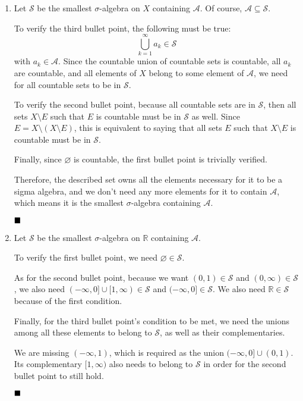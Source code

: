 \documentclass[11pt, a4paper, tikz]{article}
\renewcommand{\qed}{\hfill\blacksquare}
\newcommand{\reals}{
	\ensuremath{\mathbb{R}}
}
\newcommand{\sigmaAlgebra}[1]{
	\ensuremath{\mathcal{#1}}
}
\begin{document}
		\begin{enumerate}[label=\alph*)]
		\item Let $\sigmaAlgebra{S}$ be the smallest $\sigma$-algebra on $X$ containing $\mathcal{A}$. Of course, $\mathcal{A}\subseteq\sigmaAlgebra{S}$.
		
		To verify the third bullet point, the following must be true: \[\bigcup_{k=1}^{\infty}a_k\in\sigmaAlgebra{S}\] with $a_k\in\mathcal{A}$. Since the countable union of countable sets is countable, all $a_k$ are countable, and all elements of $X$ belong to some element of $\mathcal{A}$, we need for all countable sets to be in $\sigmaAlgebra{S}$.
		
		To verify the second bullet point, because all countable sets are in $\sigmaAlgebra{S}$, then all sets $X\setminus E$ such that $E$ is countable must be in $\sigmaAlgebra{S}$ as well. Since $E = X\setminus(X\setminus E)$, this is equivalent to saying that all sets $E$ such that $X\setminus E$ is countable must be in $\sigmaAlgebra{S}$.
		
		Finally, since $\varnothing$ is countable, the first bullet point is trivially verified.
		
		Therefore, the described set owns all the elements necessary for it to be a sigma algebra, and we don't need any more elements for it to contain $\mathcal{A}$, which means it is the smallest $\sigma$-algebra containing $\mathcal{A}$.
		
		$\qed$
		
		\item Let $\sigmaAlgebra{S}$ be the smallest $\sigma$-algebra on $\reals$ containing $\mathcal{A}$.
		
		To verify the first bullet point, we need $\varnothing\in\sigmaAlgebra{S}$.
		
		As for the second bullet point, because we want $(0,1)\in\sigmaAlgebra{S}$ and $(0,\infty)\in\sigmaAlgebra{S}$, we also need $(-\infty,0]\cup[1,\infty)\in\sigmaAlgebra{S}$ and $(-\infty,0]\in\sigmaAlgebra{S}$. We also need $\reals\in\sigmaAlgebra{S}$ because of the first condition.
		
		Finally, for the third bullet point's condition to be met, we need the unions among all these elements to belong to $\sigmaAlgebra{S}$, as well as their complementaries.
		
		We are missing $(-\infty, 1)$, which is required as the union $(-\infty,0]\cup(0,1)$. Its complementary $[1,\infty)$ also needs to belong to $\sigmaAlgebra{S}$ in order for the second bullet point to still hold.
		
		$\qed$
	\end{enumerate}
\end{document}
